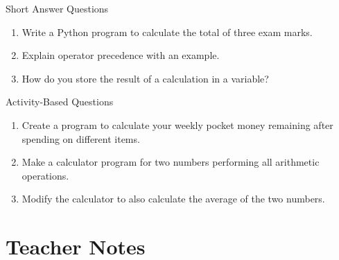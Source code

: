 \begin{exercise}{Short Answer Questions}
\begin{enumerate}
    \item Write a Python program to calculate the total of three exam marks.
    \item Explain operator precedence with an example.
    \item How do you store the result of a calculation in a variable?
\end{enumerate}
\end{exercise}

\begin{exercise}{Activity-Based Questions}
\begin{enumerate}
    \item Create a program to calculate your weekly pocket money remaining after spending on different items.
    \item Make a calculator program for two numbers performing all arithmetic operations.
    \item Modify the calculator to also calculate the average of the two numbers.
\end{enumerate}
\end{exercise}

\section{Teacher Notes}

